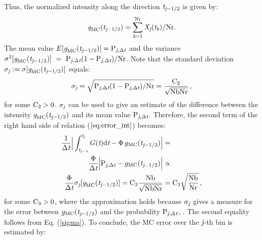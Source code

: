 Thus, the normalized intensity along the direction $\textit{t}_{\textit{j}-1/2}$ is given by:
\begin{equation}\textit{g}_{\textrm{MC}}(\textit{t}_{\textit{j}-1/2}) = \sum_{\textit{k}=1}^{\textrm{Nr}}\textit{X}_{\textit{j}}(\textit{t}_{\textit{k}})/\textrm{Nr}.\end{equation}
The mean value $E[\textit{g}_{\textrm{MC}}(\textit{t}_{\textit{j}-1/2})]=\textrm{P}_{\textit{j}, \Delta\textit{t}}$
and the variance $\sigma^2[\textit{g}_{\textrm{MC}}(\textit{t}_{\textit{j}-1/2})] ~=~ \textrm{P}_{\textit{j}, \Delta\textit{t}}(1-\textrm{P}_{\textit{j}, \Delta\textit{t}})/\textrm{Nr}$.
Note that the standard deviation $\sigma_{\textit{j}}:=\sigma[\textit{g}_{\textrm{MC}}(\textit{t}_{\textit{j}-1/2})]$ equals:
\begin{equation}\label{sigma}
\sigma_{\textit{j}}= \sqrt{\textrm{P}_{\textit{j}, \Delta\textit{t}}(1-\textrm{P}_{\textit{j}, \Delta\textit{t}})/\textrm{Nr}}= \frac{\textrm{C}_2}{\sqrt{\textrm{Nb}\textrm{Nr}}}\,, \end{equation}
 for some $\textrm{C}_{2}>0$. $\sigma_{\textit{j}}$ can be used to give an estimate of the difference between the intensity $\textit{g}_{\textrm{MC}}(\textit{t}_{\textit{j}-1/2})$ and its mean value $\textrm{P}_{\textit{j}, \Delta\textit{t}}$.
Therefore, the second term of the right hand side of relation ($\ref{eq:error_int}$) becomes:
\begin{equation}\begin{aligned}
\frac{1}{\Delta \textit{t}}\Big|\int_{\textit{t}_{\textit{j}-1}}^{\textit{t}_{\textit{j}}} G(\textit{t})\textrm{d}\textit{t} -
\Phi\, g_{\textrm{MC}}(\textit{t}_{\textit{j}-1/2})\Big| &=  \\
\frac{\Phi}{\Delta \textit{t}}\Big|\textrm{P}_{\textit{j}, \Delta\textit{t}} -g_{\textrm{MC}}(\textit{t}_{\textit{j}-1/2})\Big| &\propto  \\
  \frac{\Phi}{\Delta \textit{t}}
\sigma_{\textit{j}}[\textit{g}_{\textrm{MC}}(\textit{t}_{\textit{j}-1/2})]=\textrm{C}_3\frac{\textrm{Nb}}{\sqrt{\textrm{Nb}\textrm{Nr}}} & = \textrm{C}_3\sqrt{\frac{\textrm{Nb}}{\textrm{Nr}}}\,,
\end{aligned}
\end{equation}
for some $\textrm{C}_3>0$, where the approximation holds because $\sigma_{\textit{j}}$ gives a measure for the error between $g_{\textrm{MC}}(\textit{t}_{\textit{j}-1/2})$ and the probability $\textrm{P}_{\textit{j}, \Delta\textit{t}}$, \cite{Diez}. The second equality follows from Eq. (\ref{sigma}). To conclude, the MC error over the $\textit{j}$-th bin is estimated by:
